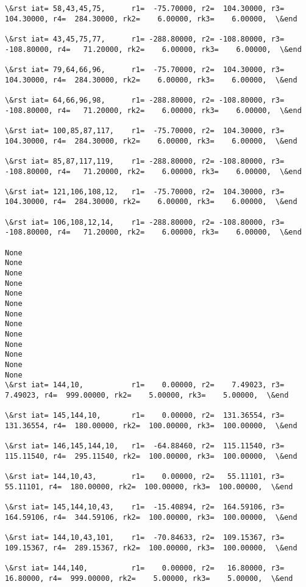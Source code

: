 \documentclass[11pt]{article}
\begin{document}
\begin{Verbatim}[commandchars=\\\{\}]
\&rst iat= 58,43,45,75,      r1=  -75.70000, r2=  104.30000, r3=  104.30000, r4=  284.30000, rk2=    6.00000, rk3=    6.00000,  \&end

\&rst iat= 43,45,75,77,      r1= -288.80000, r2= -108.80000, r3= -108.80000, r4=   71.20000, rk2=    6.00000, rk3=    6.00000,  \&end

\&rst iat= 79,64,66,96,      r1=  -75.70000, r2=  104.30000, r3=  104.30000, r4=  284.30000, rk2=    6.00000, rk3=    6.00000,  \&end

\&rst iat= 64,66,96,98,      r1= -288.80000, r2= -108.80000, r3= -108.80000, r4=   71.20000, rk2=    6.00000, rk3=    6.00000,  \&end

\&rst iat= 100,85,87,117,    r1=  -75.70000, r2=  104.30000, r3=  104.30000, r4=  284.30000, rk2=    6.00000, rk3=    6.00000,  \&end

\&rst iat= 85,87,117,119,    r1= -288.80000, r2= -108.80000, r3= -108.80000, r4=   71.20000, rk2=    6.00000, rk3=    6.00000,  \&end

\&rst iat= 121,106,108,12,   r1=  -75.70000, r2=  104.30000, r3=  104.30000, r4=  284.30000, rk2=    6.00000, rk3=    6.00000,  \&end

\&rst iat= 106,108,12,14,    r1= -288.80000, r2= -108.80000, r3= -108.80000, r4=   71.20000, rk2=    6.00000, rk3=    6.00000,  \&end

None
None
None
None
None
None
None
None
None
None
None
None
None
\&rst iat= 144,10,           r1=    0.00000, r2=    7.49023, r3=    7.49023, r4=  999.00000, rk2=    5.00000, rk3=    5.00000,  \&end

\&rst iat= 145,144,10,       r1=    0.00000, r2=  131.36554, r3=  131.36554, r4=  180.00000, rk2=  100.00000, rk3=  100.00000,  \&end

\&rst iat= 146,145,144,10,   r1=  -64.88460, r2=  115.11540, r3=  115.11540, r4=  295.11540, rk2=  100.00000, rk3=  100.00000,  \&end

\&rst iat= 144,10,43,        r1=    0.00000, r2=   55.11101, r3=   55.11101, r4=  180.00000, rk2=  100.00000, rk3=  100.00000,  \&end

\&rst iat= 145,144,10,43,    r1=  -15.40894, r2=  164.59106, r3=  164.59106, r4=  344.59106, rk2=  100.00000, rk3=  100.00000,  \&end

\&rst iat= 144,10,43,101,    r1=  -70.84633, r2=  109.15367, r3=  109.15367, r4=  289.15367, rk2=  100.00000, rk3=  100.00000,  \&end

\&rst iat= 144,140,          r1=    0.00000, r2=   16.80000, r3=   16.80000, r4=  999.00000, rk2=    5.00000, rk3=    5.00000,  \&end


\end{Verbatim}
\end{document}
